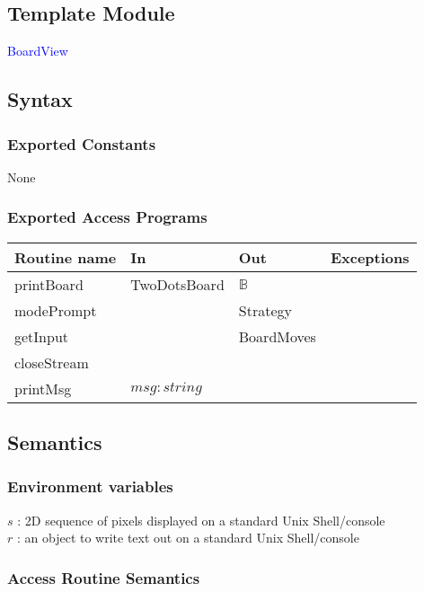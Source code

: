 \documentclass[12pt]{article}
\begin{document}
\subsection* {Template Module}

\noindent \textcolor{blue}{BoardView}

\subsection* {Syntax}

\subsubsection* {Exported Constants}

None

\subsubsection* {Exported Access Programs}

\begin{tabular}{| l | l | l | p{6cm} |}
\hline
\textbf{Routine name} & \textbf{In} & \textbf{Out} & \textbf{Exceptions}\\
\hline
printBoard & TwoDotsBoard & $\mathbb{B}$& \\
\hline
modePrompt &  & Strategy & \\
\hline
getInput &  & BoardMoves & \\
\hline
closeStream &  &  & \\
\hline
printMsg & $msg : string$ &  & \\
\hline

\end{tabular}

\subsection* {Semantics}

\subsubsection* {Environment variables}
\noindent $s$ : 2D sequence of pixels displayed on a standard Unix Shell/console\\
\noindent $r$ : an object to write text out on a standard Unix Shell/console\\

\subsubsection* {Access Routine Semantics}
\end{document}
